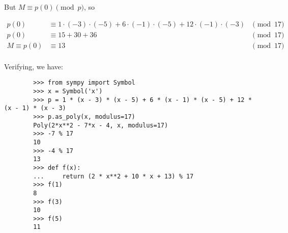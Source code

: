 \documentclass[12pt]{article}
\begin{document}
    But $M \equiv p(0) \pmod{p}$, so

    \begin{align*}
        p(0) &\equiv 1 \cdot (-3) \cdot (-5) + 6 \cdot (-1) \cdot (-5) + 12 \cdot (-1) \cdot (-3) &\pmod{17}\\
        p(0) &\equiv 15 + 30 + 36 &\pmod{17}\\
        M \equiv p(0) &\equiv 13 &\pmod{17}\\
    \end{align*}

    Verifying, we have:

    \begin{verbatim}
        >>> from sympy import Symbol
        >>> x = Symbol('x')
        >>> p = 1 * (x - 3) * (x - 5) + 6 * (x - 1) * (x - 5) + 12 * (x - 1) * (x - 3)
        >>> p.as_poly(x, modulus=17)
        Poly(2*x**2 - 7*x - 4, x, modulus=17)
        >>> -7 % 17
        10
        >>> -4 % 17
        13
        >>> def f(x):
        ...     return (2 * x**2 + 10 * x + 13) % 17
        >>> f(1)
        8
        >>> f(3)
        10
        >>> f(5)
        11
    \end{verbatim}
\end{document}
